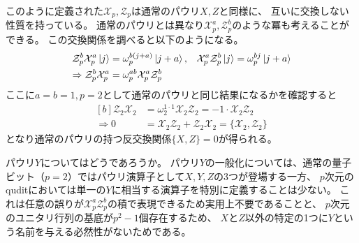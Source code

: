 \documentclass[../master.tex]{subfiles}
\begin{document}
このように定義された$\mathcal{X}_p,\mathcal{Z}_p$は通常のパウリ$X,Z$と同様に、
互いに交換しない性質を持っている。
通常のパウリとは異なり$\mathcal{X}_p^a,\mathcal{Z}_p^b$のような冪も考えることができる。
この交換関係を調べると以下のようになる。
\begin{equation}\begin{aligned}[b]
    \mathcal{Z}_p^b \mathcal{X}_p^a \ket{j} &= \omega_p^{b(j+a)} \ket{j+a },  &
    \mathcal{X}_p^a \mathcal{Z}_p^b \ket{j} &= \omega_p^{bj} \ket{j+a}\\
    \Rightarrow \mathcal{Z}_p^b \mathcal{X}_p^a &= \omega_p^{ab} \mathcal{X}_p^a \mathcal{Z}_p^b
\end{aligned}\end{equation}
ここに$a=b=1, p=2$として通常のパウリと同じ結果になるかを確認すると
\begin{equation}\begin{aligned}[b]
    \mathcal{Z}_2 \mathcal{X}_2 &= \omega_2^{1\cdot 1} \mathcal{X}_2 \mathcal{Z}_2 = -1 \cdot \mathcal{X}_2 \mathcal{Z}_2\\
    \Rightarrow 0 &= \mathcal{X}_2 \mathcal{Z}_2 + \mathcal{Z}_2 \mathcal{X}_2 = \{\mathcal{X}_2,\mathcal{Z}_2\}
\end{aligned}\end{equation}
となり通常のパウリの持つ反交換関係$\{X,Z\} = 0$が得られる。

パウリ$Y$についてはどうであろうか。
パウリ$Y$の一般化については、通常の量子ビット（$p=2$）ではパウリ演算子として$X, Y, Z$の3つが登場する一方、
$p$次元のquditにおいては単一の$Y$に相当する演算子を特別に定義することは少ない。
これは任意の誤りが$\mathcal{X}_p^a \mathcal{Z}_p^b$の積で表現できるため実用上不要であることと、
$p$次元のユニタリ行列の基底が$p^2-1$個存在するため、
$X$と$Z$以外の特定の1つに$Y$という名前を与える必然性がないためである。
\end{document}

